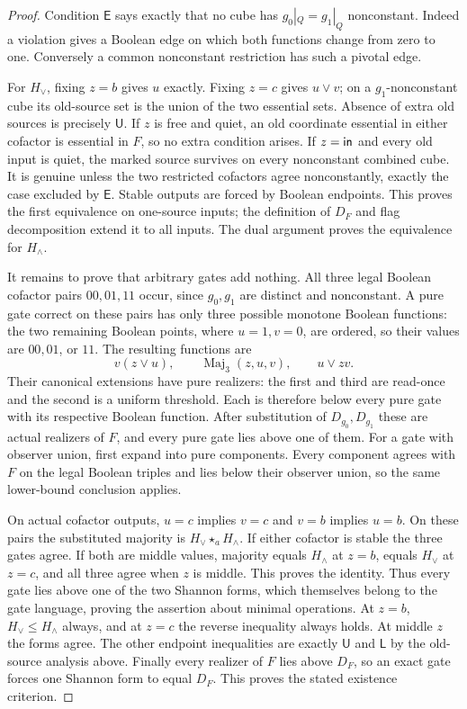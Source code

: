\begin{proof}
Condition $\mathsf E$ says exactly that no cube has
$g_0|_Q=g_1|_Q$ nonconstant. Indeed a violation gives a Boolean edge
on which both functions change from zero to one. Conversely a common
nonconstant restriction has such a pivotal edge.

For $H_\vee$, fixing $z=b$ gives $u$ exactly. Fixing $z=c$ gives
$u\vee v$; on a $g_1$-nonconstant cube its old-source set is the union
of the two essential sets. Absence of extra old sources is precisely
$\mathsf U$. If $z$ is free and quiet, an old coordinate essential in
either cofactor is essential in $F$, so no extra condition arises.
If $z=\mathsf{in}$ and every old input is quiet, the marked source survives
on every nonconstant combined cube. It is genuine unless the two
restricted cofactors agree nonconstantly, exactly the case excluded by
$\mathsf E$. Stable outputs are forced by Boolean endpoints.
This proves the first equivalence on one-source inputs; the definition
of $D_F$ and flag decomposition extend it to all inputs.
The dual argument proves the equivalence for $H_\wedge$.

It remains to prove that arbitrary gates add nothing. All three legal
Boolean cofactor pairs $00,01,11$ occur, since $g_0,g_1$ are distinct
and nonconstant. A pure gate correct on these pairs has only three
possible monotone Boolean functions: the two remaining Boolean points,
where $u=1,v=0$, are ordered, so their values are $00,01$, or $11$.
The resulting functions are
\[
 v(z\vee u),\qquad \operatorname{Maj}_3(z,u,v),\qquad u\vee zv.
\]
Their canonical extensions have pure realizers: the first and third
are read-once and the second is a uniform threshold. Each is therefore
below every pure gate with its respective Boolean function.
After substitution of $D_{g_0},D_{g_1}$ these are actual realizers of
$F$, and every pure gate lies above one of them.
For a gate with observer union, first expand into pure components.
Every component agrees with $F$ on the legal Boolean triples and lies
below their observer union, so the same lower-bound conclusion applies.

On actual cofactor outputs, $u=c$ implies $v=c$ and $v=b$ implies $u=b$.
On these pairs the substituted majority is
$H_\vee\star_a H_\wedge$. If either cofactor is stable the three
gates agree. If both are middle values, majority equals $H_\wedge$ at
$z=b$, equals $H_\vee$ at $z=c$, and all three agree when $z$ is middle.
This proves the identity. Thus every gate lies above one of the two
Shannon forms, which themselves belong to the gate language, proving
the assertion about minimal operations.
At $z=b$, $H_\vee\leq H_\wedge$ always, and at $z=c$ the reverse
inequality always holds. At middle $z$ the forms agree.
The other endpoint inequalities are exactly $\mathsf U$ and $\mathsf L$
by the old-source analysis above. Finally every realizer of $F$ lies
above $D_F$, so an exact gate forces one Shannon form to equal $D_F$.
This proves the stated existence criterion.
\end{proof}

